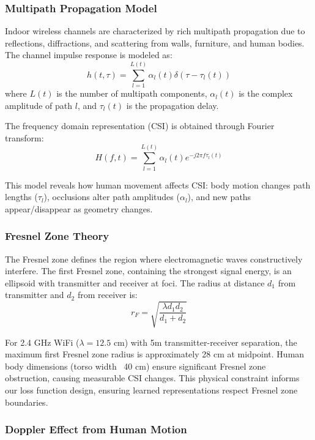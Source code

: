 \documentclass[10pt,journal,compsoc]{IEEEtran}
\begin{document}
\subsubsection{Multipath Propagation Model}

Indoor wireless channels are characterized by rich multipath propagation due to reflections, diffractions, and scattering from walls, furniture, and human bodies. The channel impulse response is modeled as:
\begin{equation}
h(t, \tau) = \sum_{l=1}^{L(t)} \alpha_l(t) \delta(\tau - \tau_l(t))
\end{equation}
where $L(t)$ is the number of multipath components, $\alpha_l(t)$ is the complex amplitude of path $l$, and $\tau_l(t)$ is the propagation delay.

The frequency domain representation (CSI) is obtained through Fourier transform:
\begin{equation}
H(f, t) = \sum_{l=1}^{L(t)} \alpha_l(t) e^{-j2\pi f \tau_l(t)}
\end{equation}

This model reveals how human movement affects CSI: body motion changes path lengths ($\tau_l$), occlusions alter path amplitudes ($\alpha_l$), and new paths appear/disappear as geometry changes.

\subsubsection{Fresnel Zone Theory}

The Fresnel zone defines the region where electromagnetic waves constructively interfere. The first Fresnel zone, containing the strongest signal energy, is an ellipsoid with transmitter and receiver at foci. The radius at distance $d_1$ from transmitter and $d_2$ from receiver is:
\begin{equation}
r_F = \sqrt{\frac{\lambda d_1 d_2}{d_1 + d_2}}
\end{equation}

For 2.4 GHz WiFi ($\lambda = 12.5$ cm) with 5m transmitter-receiver separation, the maximum first Fresnel zone radius is approximately 28 cm at midpoint. Human body dimensions (torso width ~40 cm) ensure significant Fresnel zone obstruction, causing measurable CSI changes. This physical constraint informs our loss function design, ensuring learned representations respect Fresnel zone boundaries.

\subsubsection{Doppler Effect from Human Motion}
\end{document}
